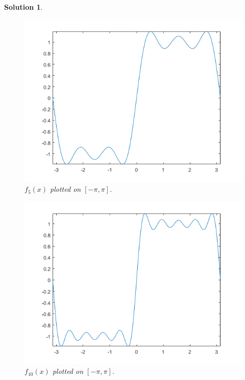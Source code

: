 \documentclass[leqno]{article}
\theoremstyle{nonumberplain}
\newtheorem{solution}{Solution}
\begin{document}
\begin{solution}
\begin{figure}[h!]
    \centering
    \includegraphics{problem_3_11_hw_5.png}
    \caption{$f_5(x)$ plotted on $[-\pi,\pi]$.}
    \label{fig:my_label}
\end{figure}
\pagebreak

\begin{figure}[h!]
    \centering
    \includegraphics{problem_6_f10.png}
    \caption{$f_{10}(x)$ plotted on $[-\pi,\pi]$.}
    \label{fig:my_label}
\end{figure}
\pagebreak


\end{solution}
\end{document}
